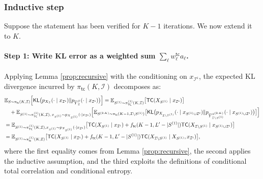 \documentclass[english]{article}
\newcommand{\cI}{\mathcal{I}}
\newcommand{\bE}{\mathbb{E}}
\newcommand{\KL}{\mathsf{KL}}
\newcommand{\ol}{\overline}
\newcommand{\E}{\mathbb{E}}
\newcommand{\TC}{\mathsf{TC}}
\newcommand{\tc}{\mathsf{tc}}
\begin{document}
\subsubsection{Inductive step} Suppose the statement has been verified for $ K - 1$ iterations. We now extend it to $ K $.

\paragraph{Step 1: Write KL error as a weighted sum $\sum_{\ell} w^\tc_{\ell} a_\ell$.}
Applying Lemma \ref{prop:recursive} with the conditioning on $x_{\cI^\mathsf{c}}$, the expected KL divergence incurred by $ \pi_{\tc}(K, \cI) $ decomposes as:
\begin{align}
    & \bE_{S \sim \pi_{\tc}(K, \cI)} \Big[\KL\big(p_{X_{\cI}}(\cdot \mid x_{\cI^\mathsf{c}}) \| p_{\ol Y_{\cI}^S}(\cdot \mid x_{\cI^\mathsf{c}}) \big)\Big]
     = \bE_{S^{(1)} \sim \pi^{(1)}_\TC(K, \cI)} \big[ \TC(X_{S^{(1)}}\mid x_{\cI^\mathsf{c}}) \big] \notag\\ 
    & \quad + \bE_{S^{(1)} \sim \pi^{(1)}_\TC(K, \cI),\,x_{S^{(1)}} \sim p_{X_{S^{(1)}}}(\cdot \mid x_{\cI^\mathsf{c}})} \Big[ \bE_{S^{(2:K)} \sim \pi_{\tc}(K-1, \cI \setminus S^{(1)})} \big[\KL \big(p_{X_{\cI \setminus S^{(1)}}}(\cdot \mid x_{S^{(1)} \cup \cI^\mathsf{c}}) \| p_{\ol Y_{\cI \setminus S^{(1)}}^{S^{(2:K)}}}(\cdot \mid x_{S^{(1)} \cup \cI^\mathsf{c}} ) \big) \big] \Big] \notag \\
    &= \E_{S^{(1)} \sim \pi^{(1)}_\TC(K, \cI), x_{S^{(1)}} \sim p_{X_{S^{(1)}}}(\cdot \mid x_{\cI^\mathsf{c}})} \big[ \TC(X_{S^{(1)}}\mid x_{\cI^\mathsf{c}} ) + f_\tc(K - 1, L' - |S^{(1)}|) \TC(X_{\cI \setminus S^{(1)}} \mid x_{S^{(1)} \cup \cI^\mathsf{c}}) \big] \notag \\
    &= \E_{S^{(1)}  \sim \pi^{(1)}_\tc (K, \cI)} \big[ \TC(X_{S^{(1)} } \mid x_{\cI^\mathsf{c}}) + f_\tc(K - 1, L' - |S^{(1)}|) \TC( X_{\cI \setminus S^{(1)} }\mid X_{S^{(1)} } , x_{\cI^\mathsf{c}}) \big],\label{eq:KL-decomp-TC}
\end{align}
where the first equality comes from Lemma \ref{prop:recursive}, the second applies the inductive assumption, and the third exploits the definitions of conditional total correlation and conditional entropy.
\end{document}
